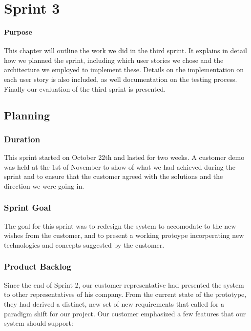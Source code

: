 \chapter{Sprint 3}

\minitoc

\subsubsection{Purpose}

This chapter will outline the work we did in the third sprint. It explains in detail how we planned the sprint, including which user stories we chose and the architecture we employed to implement these. Details on the implementation on each user story is also included, as well documentation on the testing process. Finally our evaluation of the third sprint is presented. 

\clearpage

\section{Planning}

\subsection{Duration}
This sprint started on October 22th and lasted for two weeks. A customer demo was held at the 1st of November to show of what we had achieved during the sprint and to ensure that the customer agreed with the solutions and the direction we were going in.

\subsection{Sprint Goal}
The goal for this sprint was to redesign the system to accomodate to the new wishes from the customer, and to present a working protoype incorperating new technologies and concepts suggested by the customer.

\subsection{Product Backlog}
Since the end of Sprint 2, our customer representative had presented the system to other representatives of his company. From the current state of the prototype, they had derived a distinct, new set of new requirements that called for a paradigm shift for our project. Our customer emphasized a few features that our system should support:

